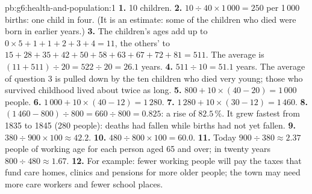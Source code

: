 \begin{solution}{pb:g6:health-and-population:1}
\textbf{1.} 10 children.
\textbf{2.} $10 \div 40 \times 1\,000 = 250$ per 1\,000 births: one child in four.
(It is an estimate: some of the children who died were born in earlier years.)
\textbf{3.} The children's ages add up to $0 \times 5 + 1 + 1 + 2 + 3 + 4 = 11$, the
others' to $15 + 28 + 35 + 42 + 50 + 58 + 63 + 67 + 72 + 81 = 511$. The average is
$(11 + 511) \div 20 = 522 \div 20 = 26.1$ years.
\textbf{4.} $511 \div 10 = 51.1$ years. The average of question 3 is pulled down by
the ten children who died very young; those who survived childhood lived about
twice as long.
\textbf{5.} $800 + 10 \times (40 - 20) = 1\,000$ people.
\textbf{6.} $1\,000 + 10 \times (40 - 12) = 1\,280$.
\textbf{7.} $1\,280 + 10 \times (30 - 12) = 1\,460$.
\textbf{8.} $(1\,460 - 800) \div 800 = 660 \div 800 = 0.825$: a rise of $82.5\,\%$.
It grew fastest from 1835 to 1845 (280 people): deaths had fallen while births
had not yet fallen.
\textbf{9.} $380 \div 900 \times 100 \approx 42.2$.
\textbf{10.} $480 \div 800 \times 100 = 60.0$.
\textbf{11.} Today $900 \div 380 \approx 2.37$ people of working age for each person
aged 65 and over; in twenty years $800 \div 480 \approx 1.67$.
\textbf{12.} For example: fewer working people will pay the taxes that fund care
homes, clinics and pensions for more older people; the town may need more care
workers and fewer school places.
\end{solution}

